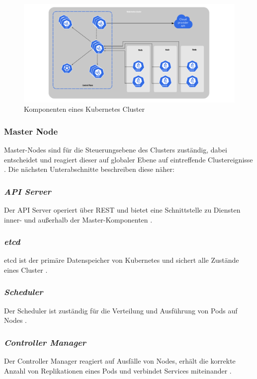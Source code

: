 \begin{figure}
    \centering
    \includegraphics[width=1.0\columnwidth]{images/components-of-kubernetes.png}
    \caption{Komponenten eines Kubernetes Cluster \cite{kubernetesnodekomponenten}}
    \label{fig:cluster}
\end{figure}

\subsubsection{Master Node}
Master-Nodes sind für die Steuerungsebene des Clusters zuständig,
dabei entscheidet und reagiert dieser auf globaler Ebene auf eintreffende Clustereignisse \cite{kuberneteskomponenten}.
Die nächsten Unterabschnitte beschreiben diese näher:

\subsubsection{\textit{API Server}}
Der API Server operiert über REST und bietet eine Schnittstelle zu Diensten
inner- und außerhalb der Master-Komponenten \cite{kuberneteskomponenten}.

\subsubsection{\textit{etcd}}
etcd ist der primäre Datenspeicher von Kubernetes und sichert alle Zustände eines
Cluster \cite{kuberneteskomponenten}.

\subsubsection{\textit{Scheduler}}
Der Scheduler ist zuständig für die Verteilung und Ausführung von Pods auf Nodes \cite{kuberneteskomponenten}.

\subsubsection{\textit{Controller Manager}}
Der Controller Manager reagiert auf Ausfälle von Nodes, erhält die korrekte
Anzahl von Replikationen eines Pods und verbindet Services miteinander \cite{kuberneteskomponenten}.

